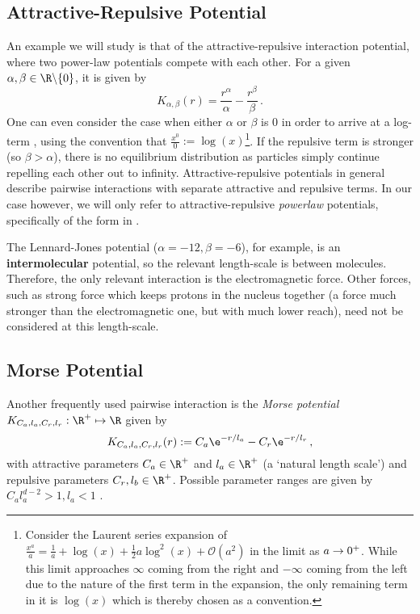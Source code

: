 \subsection{Attractive-Repulsive Potential}
An example we will study is that of the attractive-repulsive interaction potential, where two power-law potentials compete with each other.
For a given $\alpha, \beta \in \R \backslash \{0\}$, it is given by
\begin{equation}
  K_{\alpha, \beta}(r) = \frac{r^\alpha}{\alpha} - \frac{r^\beta}{\beta}\,.
  \label{eq:attractive-repulsive-potential}
\end{equation}
One can even consider the case when either $\alpha$ or $\beta$ is 0 in order to arrive at a log-term \parencite{2017-explicit-solutions}, using the convention that $\frac{x^0}{0} := \log(x)$\footnote{
  Consider the Laurent series expansion of $\frac{x^a}{a} = \frac{1}{a} + \log(x) + \frac{1}{2}a \log^2(x) + \mathcal{O}(a^2)$ in the limit as $a \rightarrow 0^+$.
  While this limit approaches $\infty$ coming from the right and $-\infty$ coming from the left due to the nature of the first term in the expansion, the only remaining term in it is $\log(x)$ which is thereby chosen as a convention.
}.
If the repulsive term is stronger (so $\beta > \alpha$), there is no equilibrium distribution as particles simply continue repelling each other out to infinity.
Attractive-repulsive potentials in general describe pairwise interactions with separate attractive and repulsive terms.
In our case however, we will only refer to attractive-repulsive \textit{powerlaw} potentials, specifically of the form in .

The Lennard-Jones potential ($\alpha=-12, \beta=-6$), for example, is an \textbf{intermolecular} potential, so the relevant length-scale is between molecules.
Therefore, the only relevant interaction is the electromagnetic force.
Other forces, such as strong force which keeps protons in the nucleus together (a force much stronger than the electromagnetic one, but with much lower reach), need not be considered at this length-scale.

\subsection{Morse Potential}
Another frequently used pairwise interaction is the \textit{Morse potential} $K_{C_a, l_a, C_r, l_r}: \R^+ \mapsto \R$ given by
\begin{equation}
  K_{C_a, l_a, C_r, l_r}(r) := C_a \e^{-r / l_a} - C_r \e^{-r / l_r}\,,
  \label{eq:morse-potential}
\end{equation}
with attractive parameters $C_a \in \R^+$ and $l_a \in \R^+$ (a `natural length scale') and repulsive parameters $C_r, l_b \in \R^+$.
Possible parameter ranges are given by $C_a l_a^{d-2} > 1, l_a < 1$ \parencite{2006-self-propelled,2014-explicit-flock-solutions-for-quasi-morse-potentials}.
\hierKoennteIhreWerbungStehen

